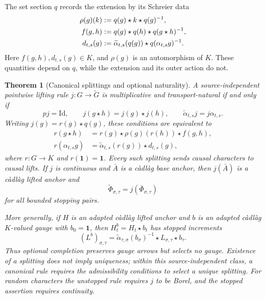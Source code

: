 \documentclass[10pt,reqno]{amsart}
\theoremstyle{plain}
\newtheorem{theorem}{Theorem}[section]
\theoremstyle{definition}
\theoremstyle{remark}
\begin{document}
The set section \(q\) records the extension by its Schreier data
\begin{align}
 \rho(g)(k)&:=q(g)\star k\star q(g)^{-1},\notag\\
 f(g,h)&:=q(g)\star q(h)\star q(g\star h)^{-1},\notag\\
 d_{t,s}(g)&:=\widetilde\alpha_{t,s}(q(g))
       \star q(\alpha_{t,s}g)^{-1}.
 \label{cc:eq-Schreier-data}
\end{align}
Here \(f(g,h),d_{t,s}(g)\in K\), and \(\rho(g)\) is an automorphism of
\(K\).  These quantities depend on \(q\), while the extension and its
outer action do not.

\begin{theorem}[Canonical splittings and optional naturality]
\label{cc:prop-canonicality-criterion}
A source-independent pointwise lifting rule \(j:G\to\widetilde G\) is
multiplicative and transport-natural if and only if
\begin{equation}
 pj={\mathrm{Id}},\qquad
 j(g\star h)=j(g)\star j(h),\qquad
 \widetilde\alpha_{t,s}j=j\alpha_{t,s}.
 \label{cc:eq-strict-splitting}
\end{equation}
Writing \(j(g)=r(g)\star q(g)\), these conditions are equivalent to
\begin{align}
 r(g\star h)
 &=r(g)\star\rho(g)(r(h))\star f(g,h),
 \label{cc:eq-splitting-factor-equation}\\
 r(\alpha_{t,s}g)
 &=\widetilde\alpha_{t,s}(r(g))\star d_{t,s}(g),
 \label{cc:eq-splitting-transport-equation}
\end{align}
where \(r:G\to K\) and \(r({\mathbf 1})={\mathbf 1}\).  Every such splitting sends
causal characters to causal lifts.  If \(j\) is continuous and \(\bar A\)
is a càdlàg base anchor, then \(j(\bar A)\) is a càdlàg lifted anchor and
\begin{equation}
 \widetilde\Phi_{\sigma,\tau}=j(\bar\Phi_{\sigma,\tau})
 \label{cc:eq-optional-splitting-naturality}
\end{equation}
for all bounded stopping pairs.

More generally, if \(H\) is an adapted càdlàg lifted anchor and \(b\) is
an adapted càdlàg \(K\)-valued gauge with \(b_0={\mathbf 1}\), then
\(H^b_t=H_t\star b_t\) has stopped increments
\begin{equation}
 (L^b)_{\sigma,\tau}
 =\widetilde\alpha_{\tau,\sigma}(b_\sigma)^{-1}
  \star L_{\sigma,\tau}\star b_\tau.
 \label{cc:eq-stopped-vertex-gauge}
\end{equation}
Thus optional completion preserves gauge arrows but selects no gauge.
Existence of a splitting does not imply uniqueness; within this
source-independent class, a canonical rule requires the admissibility
conditions to select a unique splitting.  For random characters the
unstopped rule requires \(j\) to be Borel, and the stopped assertion
requires continuity.
\end{theorem}
\end{document}
